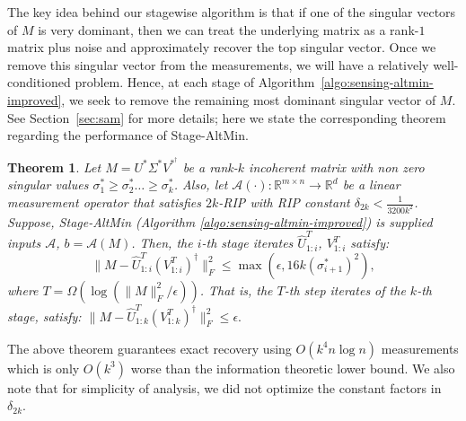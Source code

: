 \documentclass[11pt]{article}
\theoremstyle{plain}
\newtheorem{theorem}{Theorem}[section]
\theoremstyle{definition}
\newcommand{\rmn}{\mathbb{R}^{m \times n}}
\newcommand{\calA}{\mathcal{A}}
\newcommand{\aff}{{\mathcal A}}
\newcommand{\so}{\sigma^*}
\newcommand{\as}{AltMinSense\ }
\newcommand{\Uw}{\widehat{U}}
\begin{document}
The key idea behind our stagewise algorithm is that if one of the singular vectors of $M$ is very dominant, then we can treat the underlying matrix as a rank-$1$ matrix plus noise and approximately recover the top singular vector. Once we remove this singular vector from the measurements, we will have a relatively well-conditioned problem. Hence, at each stage of Algorithm~\ref{algo:sensing-altmin-improved}, we seek to remove the remaining most dominant singular vector of $M$. See Section~\ref{sec:sam} for more details; here we state the corresponding theorem regarding the performance of Stage-AltMin. %
\begin{theorem}\label{thm:sam_err}
Let $M=U^*\Sigma^*V^{*^\dag }$ be a rank-$k$ incoherent matrix with non zero singular values $\sigma_1^*\geq \sigma_2^*\dots\geq \sigma_k^*$. Also, let $\calA(\cdot):\rmn \rightarrow \mathbb{R}^d$ be a linear measurement operator that satisfies $2k$-RIP with RIP constant $\delta_{2k}<\frac{1}{3200k^2}$.  Suppose, Stage-AltMin (Algorithm \ref{algo:sensing-altmin-improved}) is supplied inputs $\aff$, $b=\aff(M)$. Then, the $i$-th stage iterates $\Uw^T_{1:i}$, $V^T_{1:i}$ satisfy: $$\|M-\Uw^T_{1:i}\left(V^T_{1:i}\right)^{\dag}\|_F^2\leq \max(\epsilon, 16k(\so_{i+1})^2),$$%
where $T= \Omega\left(\log(\|M\|_F^2/\epsilon)\right)$. That is, the $T$-th step iterates of the $k$-th stage, satisfy: $\|M-\Uw^T_{1:k}\left(V^T_{1:k}\right)^{\dag}\|_F^2\leq \epsilon.$
\end{theorem}
The above theorem guarantees exact recovery using $O(k^4 n \log n)$ measurements which is only $O(k^3)$ worse than the information theoretic lower bound. We also note that for simplicity of analysis, we did not optimize the constant factors in $\delta_{2k}$.%
\end{document}
